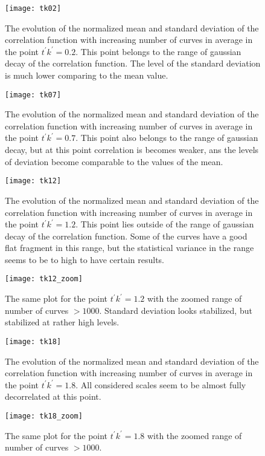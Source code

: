 \documentclass[landscape, 12pt,a4paper,notitlepage]{report}
\begin{document}
\newpage
\begin{figure}
	\centering
	\texttt{[image: tk02]} \\
	\caption[.]{The evolution of the normalized mean and standard deviation of the correlation function with increasing number of curves in average in the point $t^\prime k^\prime =0.2$. This point belongs to the range of gaussian decay of the correlation function. The level of the standard deviation is much lower comparing to the mean value.} 
\end{figure}
\newpage
\begin{figure}
	\centering
	\texttt{[image: tk07]} \\
	\caption[.]{The evolution of the normalized mean and standard deviation of the correlation function with increasing number of curves in average in the point $t^\prime k^\prime =0.7$. This point also belongs to the range of gaussian decay, but at this point correlation is becomes weaker, ans the levels of deviation become comparable to the values of the mean.} 
\end{figure}
\newpage
\begin{figure}
	\centering
	\texttt{[image: tk12]} \\
	\caption[.]{The evolution of the normalized mean and standard deviation of the correlation function with increasing number of curves in average in the point $t^\prime k^\prime = 1.2$. This point lies outside of the range of gaussian decay of the correlation function. Some of the curves have a good flat fragment in this range, but the statistical variance in the range seems to be to high to have certain results.} 
\end{figure}
\newpage
\begin{figure}
	\centering
	\texttt{[image: tk12\_zoom]} \\
	\caption[.]{The same plot for the point $t^\prime k^\prime = 1.2$ with the zoomed range of number of curves $> 1000$. Standard deviation looks stabilized, but stabilized at rather high levels.} 
\end{figure}
\newpage
\begin{figure}
	\centering
	\texttt{[image: tk18]} \\
	\caption[.]{The evolution of the normalized mean and standard deviation of the correlation function with increasing number of curves in average in the point $t^\prime k^\prime = 1.8$. All considered scales seem to be almost fully decorrelated at this point.} 
\end{figure}
\newpage
\begin{figure}
	\centering
	\texttt{[image: tk18\_zoom]} \\
	\caption[.]{The same plot for the point $t^\prime k^\prime = 1.8$ with the zoomed range of number of curves $> 1000$.} 
\end{figure}
\end{document}
